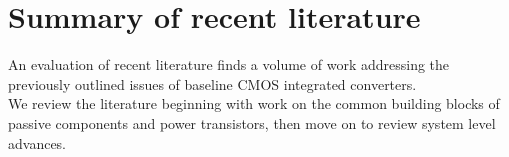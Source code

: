 \documentclass[letterpaper,twocolumn,10pt]{article}
\begin{document}

\section{Summary of recent literature} \label{litReview}
An evaluation of recent literature finds a volume of work addressing the previously outlined issues of baseline CMOS integrated converters.\\
We review the literature beginning with work on the common building blocks of passive components and power transistors, then move on to review system level advances.\\ 
\end{document}
